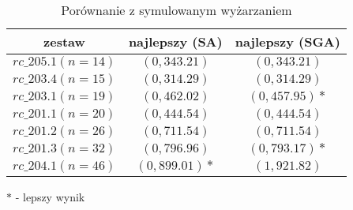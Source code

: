 \begin{frame}
\begin{table}
\centering
\caption{Porównanie z symulowanym wyżarzaniem}
\begin{tabular}{c|c|c}
zestaw & najlepszy (SA) & najlepszy (SGA) \\ \hline
$rc\_205.1 (n=14)$ & $(0, 343.21)$ & $(0, 343.21)$ \\
$rc\_203.4 (n=15)$ & $(0, 314.29)$ & $(0, 314.29)$ \\
$rc\_203.1 (n=19)$ & $(0, 462.02)$ & $(0, 457.95)*$ \\
$rc\_201.1 (n=20)$ & $(0, 444.54)$ & $(0, 444.54)$ \\
$rc\_201.2 (n=26)$ & $(0, 711.54)$ & $(0, 711.54)$ \\
$rc\_201.3 (n=32)$ & $(0, 796.96)$ & $(0, 793.17)*$ \\
$rc\_204.1 (n=46)$ & $(0, 899.01)*$ & $(1, 921.82)$
\end{tabular}
\end{table}
$*$ - lepszy wynik
\end{frame}
